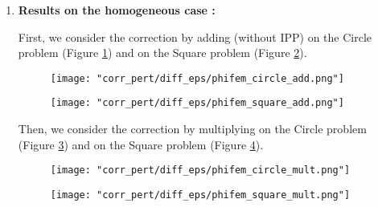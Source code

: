 \begin{enumerate}[label=\textbullet]
	\item \textbf{Results on the homogeneous case :}
	
	First, we consider the correction by adding (without IPP) on the Circle problem (Figure \ref{corr_pert_phifem_circle_add}) and on the Square problem (Figure \ref{corr_pert_phifem_square_add}).
	
	\begin{minipage}{0.48\linewidth}
		\begin{figure}[H]
			\centering
			\texttt{[image: "corr\_pert/diff\_eps/phifem\_circle\_add.png"]}
			\label{corr_pert_phifem_circle_add}
		\end{figure} 
	\end{minipage}
	\begin{minipage}{0.48\linewidth}
		\begin{figure}[H]
			\centering
			\texttt{[image: "corr\_pert/diff\_eps/phifem\_square\_add.png"]}
			\label{corr_pert_phifem_square_add}
		\end{figure} 
	\end{minipage}
	
	Then, we consider the correction by multiplying on the Circle problem (Figure \ref{corr_pert_phifem_circle_mult}) and on the Square problem (Figure \ref{corr_pert_phifem_square_mult}).
	
	\begin{minipage}{0.48\linewidth}
		\begin{figure}[H]
			\centering
			\texttt{[image: "corr\_pert/diff\_eps/phifem\_circle\_mult.png"]}
			\label{corr_pert_phifem_circle_mult}
		\end{figure} 
	\end{minipage}
	\begin{minipage}{0.48\linewidth}
		\begin{figure}[H]
			\centering
			\texttt{[image: "corr\_pert/diff\_eps/phifem\_square\_mult.png"]}
			\label{corr_pert_phifem_square_mult}
		\end{figure} 
	\end{minipage}
	

\end{enumerate}
